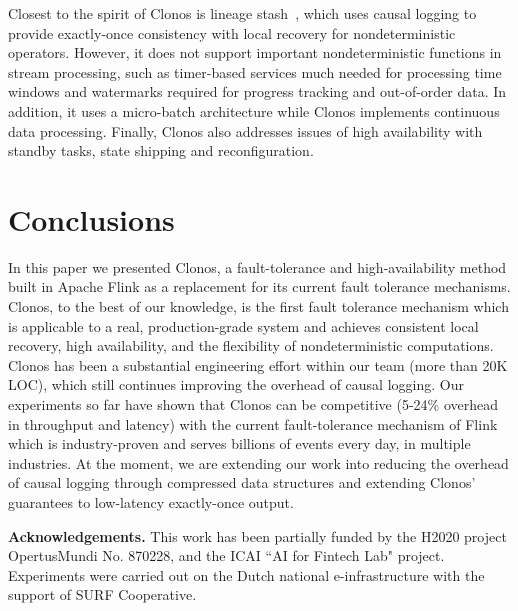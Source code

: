 \documentclass[sigconf]{acmart}
\newcommand{\para}[1]{\vspace{1mm}\noindent\textbf{#1.}}
\begin{document}
Closest to the spirit of Clonos is lineage stash~\cite{wang2019lineage}, which uses causal logging to provide exactly-once consistency with local recovery for nondeterministic operators. However, it does not support important nondeterministic functions in stream processing, such as timer-based services much needed for processing time windows and watermarks required for progress tracking and out-of-order data.
In addition, it uses a micro-batch architecture while Clonos implements continuous data processing. Finally, Clonos also addresses issues of high availability with standby tasks, state shipping and reconfiguration.


\section{Conclusions}
\label{sec:conclusions}

In this paper we presented Clonos, a fault-tolerance and high-availability method built in Apache Flink as a replacement for its current fault tolerance mechanisms. Clonos, to the best of our knowledge, is the first fault tolerance mechanism which is applicable to a real, production-grade system and achieves consistent local recovery, high availability, and the flexibility of nondeterministic computations. Clonos has been a substantial engineering effort within our team (more than 20K LOC), which still continues improving the overhead of causal logging. Our experiments so far have shown that Clonos can be competitive (5-24\% overhead in throughput and latency) with the current fault-tolerance mechanism of Flink which is industry-proven and serves billions of events every day, in multiple industries. 
At the moment, we are extending our work into reducing the overhead of causal logging through compressed data structures and extending Clonos' guarantees to low-latency exactly-once output.


\para{Acknowledgements} This work has been partially funded by the H2020 project OpertusMundi No. 870228, and the ICAI ``AI for Fintech Lab" project. Experiments were carried out on the Dutch national e-infrastructure with the support of SURF Cooperative.



\balance

  
  
  

\balance
  
  
\end{document}
